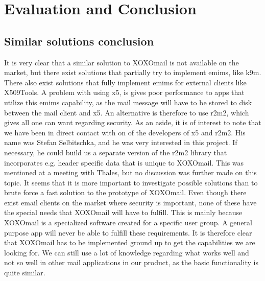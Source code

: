 \section{Evaluation and Conclusion}

\subsection{Similar solutions conclusion}
It is very clear that a similar solution to XOXOmail is not available on the market, but there exist solutions that partially try to implement \gls{emims}, like \gls{k9m}. There also exist solutions that fully implement \gls{emims} for external clients like X509Tools. A problem with using \gls{x5}, is gives poor performance to apps that utilize this \gls{emims} capability, as the mail message will have to be stored to disk between the mail client and \gls{x5}. An alternative is therefore to use \gls{r2m2}, which gives all one can want regarding security.
\newline
\newline
As an aside, it is of interest to note that we have been in direct contact with on of the developers of \gls{x5} and \gls{r2m2}. His name was Stefan Selbitschka, and he was very interested in this project. If necessary, he could build us a separate version of the \gls{r2m2} library that incorporates e.g. header specific data that is unique to XOXOmail. This was mentioned at a meeting with Thales, but no discussion was further made on this topic. It seems that it is more important to investigate possible solutions than to brute force a fast solution to the prototype of XOXOmail.
\newline
\newline
Even though there exist email clients on the market where security is important, none of these have the special needs that XOXOmail will have to fulfill. This is mainly because XOXOmail is a specialized software created for a specific user group. A general purpose app will never be able to fulfill these requirements. It is therefore clear that XOXOmail has to be implemented ground up to get the capabilities we are looking for. We can still use a lot of knowledge regarding what works well and not so well in other mail applications in our product, as the basic functionality is quite similar.


